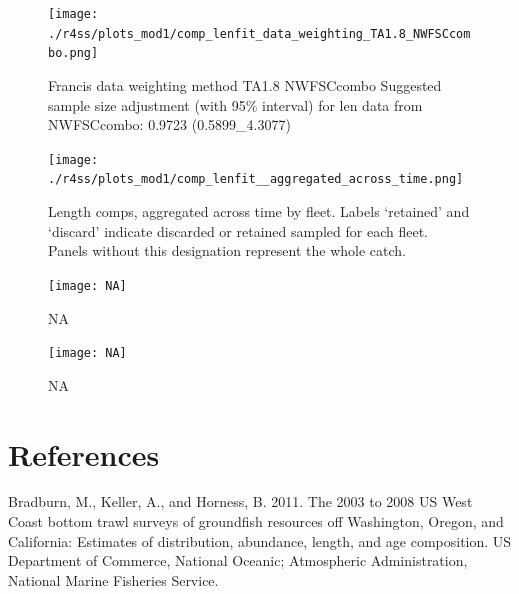 \documentclass[12pt,]{article}
\begin{document}
\begin{figure}
\centering
\texttt{[image: ./r4ss/plots\_mod1/comp\_lenfit\_data\_weighting\_TA1.8\_NWFSCcombo.png]}
\caption{Francis data weighting method TA1.8 NWFSCcombo Suggested sample
size adjustment (with 95\% interval) for len data from NWFSCcombo:
0.9723 (0.5899\_4.3077)
\label{fig:mod1_33_comp_lenfit_data_weighting_TA1.8_NWFSCcombo}}
\end{figure}

\begin{figure}
\centering
\texttt{[image: ./r4ss/plots\_mod1/comp\_lenfit\_\_aggregated\_across\_time.png]}
\caption{Length comps, aggregated across time by fleet. Labels
`retained' and `discard' indicate discarded or retained sampled for each
fleet. Panels without this designation represent the whole catch.
\label{fig:mod1_34_comp_lenfit__aggregated_across_time}}
\end{figure}

\begin{figure}
\centering
\texttt{[image: NA]}
\caption{NA \label{fig:mod1_35_NA}}
\end{figure}

\begin{figure}
\centering
\texttt{[image: NA]}
\caption{NA \label{fig:mod1_36_NA}}
\end{figure}

\FloatBarrier

\FloatBarrier

\FloatBarrier

\FloatBarrier

\FloatBarrier

\FloatBarrier

\FloatBarrier

\FloatBarrier

\newpage

\color{black}

\section*{References}\label{references}

\renewcommand{\thepage}{}

\hypertarget{refs}{}
\hypertarget{ref-bradburn_2003_2011}{}
Bradburn, M., Keller, A., and Horness, B. 2011. The 2003 to 2008 US West
Coast bottom trawl surveys of groundfish resources off Washington,
Oregon, and California: Estimates of distribution, abundance, length,
and age composition. US Department of Commerce, National Oceanic;
Atmospheric Administration, National Marine Fisheries Service.
\end{document}
